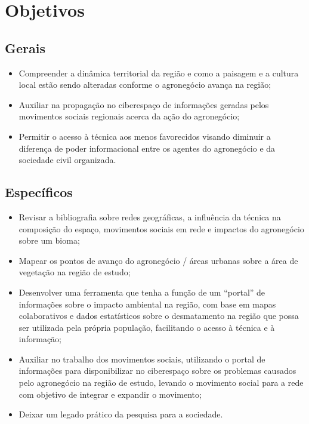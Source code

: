 \chapter{Objetivos}

\section{Gerais}

\begin{itemize}
 \item Compreender a dinâmica territorial da região e como a paisagem e a cultura local estão sendo alteradas conforme o agronegócio avança na região;
 \item Auxiliar na propagação no ciberespaço de informações geradas pelos movimentos sociais regionais acerca da ação do agronegócio;
 \item Permitir o acesso à técnica aos menos favorecidos visando diminuir a diferença de poder informacional entre os agentes do agronegócio e da sociedade civil organizada.
\end{itemize}

\section{Específicos}

\begin{itemize}
 \item Revisar a bibliografia sobre redes geográficas, a influência da técnica na composição do espaço, movimentos sociais em rede e impactos do agronegócio sobre um bioma;
 \item Mapear os pontos de avanço do agronegócio / áreas urbanas sobre a área de vegetação na região de estudo;
 \item Desenvolver uma ferramenta que tenha a função de um “portal” de informações sobre o impacto ambiental na região, com base em mapas colaborativos e dados estatísticos sobre o desmatamento na região que possa ser utilizada pela própria população, facilitando o acesso à técnica e à informação;
 \item Auxiliar no trabalho dos movimentos sociais, utilizando o portal de informações para disponibilizar no ciberespaço sobre os problemas causados pelo agronegócio na região de estudo, levando o movimento social para a rede com objetivo de integrar e expandir o movimento;
 \item Deixar um legado prático da pesquisa para a sociedade.
\end{itemize}

